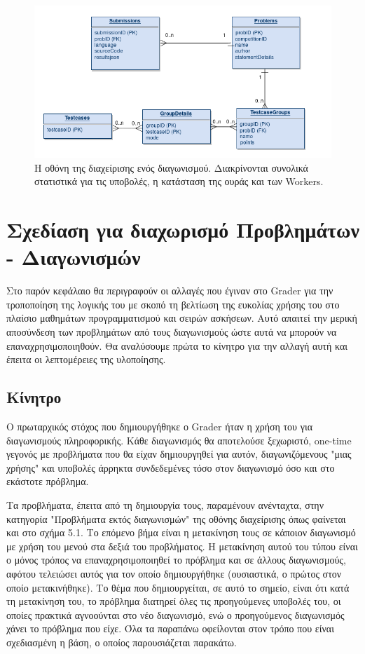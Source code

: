 \documentclass[diploma]{softlab-thesis}
\begin{document}
\begin{figure}
  \centering
  \includegraphics[scale=0.3,trim=4 4 4 4,clip]{Figures/groupsafter.png}
  \caption[Οθόνη διαχείρισης προβλήματος]{Η οθόνη της διαχείρισης ενός διαγωνισμού.
  Διακρίνονται συνολικά στατιστικά για τις υποβολές, η κατάσταση της ουράς και των
  Workers.}
\end{figure}

\chapter{Σχεδίαση για διαχωρισμό Προβλημάτων - Διαγωνισμών}

Στο παρόν κεφάλαιο θα περιγραφούν οι αλλαγές που έγιναν στο Grader για την
τροποποίηση της λογικής του με σκοπό τη βελτίωση της ευκολίας χρήσης του
στο πλαίσιο μαθημάτων προγραμματισμού και σειρών ασκήσεων. Αυτό απαιτεί την
μερική αποσύνδεση των προβλημάτων από τους διαγωνισμούς ώστε αυτά να μπορούν
να επαναχρησιμοποιηθούν. Θα αναλύσουμε πρώτα το κίνητρο για την αλλαγή αυτή
και έπειτα οι λεπτομέρειες της υλοποίησης.

\section{Κίνητρο}

Ο πρωταρχικός στόχος που δημιουργήθηκε ο Grader ήταν η χρήση του για διαγωνισμούς
πληροφορικής. Κάθε διαγωνισμός θα αποτελούσε ξεχωριστό, one-time γεγονός με
προβλήματα που θα είχαν δημιουργηθεί για αυτόν, διαγωνιζόμενους "μιας χρήσης"
και υποβολές άρρηκτα συνδεδεμένες τόσο στον διαγωνισμό όσο και στο εκάστοτε
πρόβλημα.

\bigskip

Τα προβλήματα, έπειτα από τη δημιουργία τους, παραμένουν ανένταχτα, στην κατηγορία
"Προβλήματα εκτός διαγωνισμών" της οθόνης διαχείρισης
όπως φαίνεται και στο σχήμα 5.1. Το επόμενο βήμα είναι η μετακίνηση τους
σε κάποιον διαγωνισμό με χρήση του μενού στα δεξιά του προβλήματος. Η μετακίνηση
αυτού του τύπου είναι ο μόνος τρόπος να επαναχρησιμοποιηθεί το πρόβλημα και σε
άλλους διαγωνισμούς, αφότου τελειώσει αυτός για τον οποίο δημιουργήθηκε
(ουσιαστικά, ο πρώτος στον οποίο μετακινήθηκε). Το θέμα που δημιουργείται, σε αυτό
το σημείο, είναι ότι κατά τη μετακίνηση του, το πρόβλημα διατηρεί όλες τις
προηγούμενες υποβολές του, οι οποίες πρακτικά αγνοούνται στο νέο διαγωνισμό, ενώ
ο προηγούμενος διαγωνισμός χάνει το πρόβλημα που είχε. Όλα τα παραπάνω οφείλονται
στον τρόπο που είναι σχεδιασμένη η βάση, ο οποίος παρουσιάζεται παρακάτω.
\end{document}
